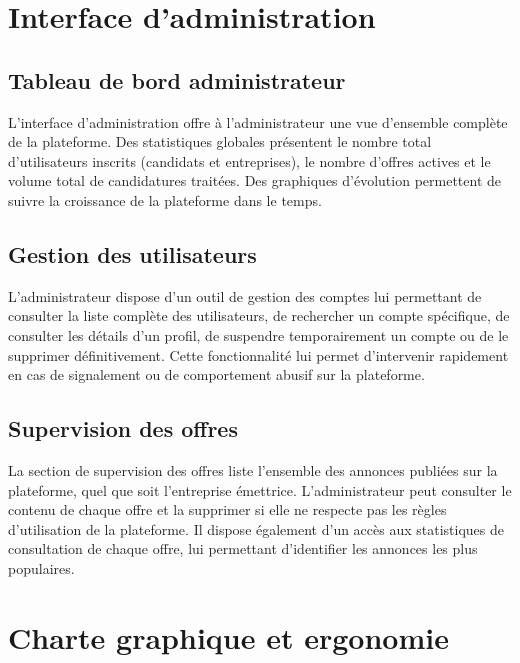 \documentclass[12pt,a4paper]{report}
\begin{document}
\section{Interface d'administration}

\subsection{Tableau de bord administrateur}

L'interface d'administration offre à l'administrateur une vue d'ensemble complète de la plateforme. Des statistiques globales présentent le nombre total d'utilisateurs inscrits (candidats et entreprises), le nombre d'offres actives et le volume total de candidatures traitées. Des graphiques d'évolution permettent de suivre la croissance de la plateforme dans le temps.

\subsection{Gestion des utilisateurs}

L'administrateur dispose d'un outil de gestion des comptes lui permettant de consulter la liste complète des utilisateurs, de rechercher un compte spécifique, de consulter les détails d'un profil, de suspendre temporairement un compte ou de le supprimer définitivement. Cette fonctionnalité lui permet d'intervenir rapidement en cas de signalement ou de comportement abusif sur la plateforme.

\subsection{Supervision des offres}

La section de supervision des offres liste l'ensemble des annonces publiées sur la plateforme, quel que soit l'entreprise émettrice. L'administrateur peut consulter le contenu de chaque offre et la supprimer si elle ne respecte pas les règles d'utilisation de la plateforme. Il dispose également d'un accès aux statistiques de consultation de chaque offre, lui permettant d'identifier les annonces les plus populaires.

\section{Charte graphique et ergonomie}
\end{document}
